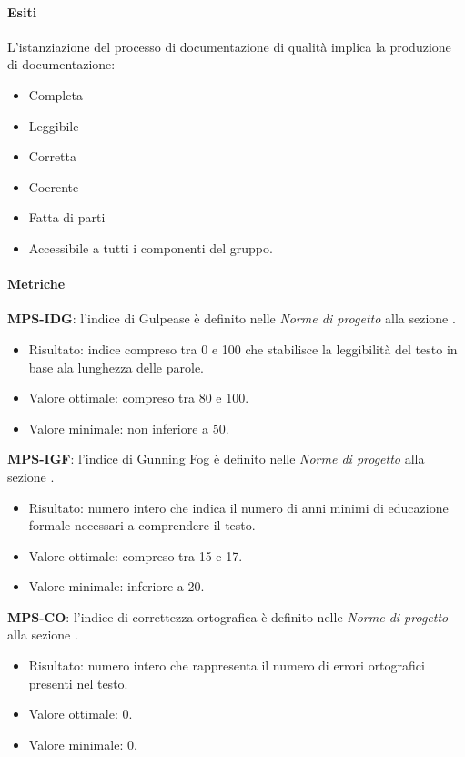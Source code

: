 \documentclass[../piano-di-qualifica.tex]{subfiles}
\begin{document}
\paragraph{Esiti}%
\label{par:esiti}
L'istanziazione del processo di documentazione di qualità implica la produzione di documentazione:
\begin{itemize}
  \item Completa
  \item Leggibile
  \item Corretta
  \item Coerente
  \item Fatta di parti
  \item Accessibile a tutti i componenti del gruppo.
\end{itemize}

\paragraph{Metriche}%
\label{par:metriche}

\textbf{MPS-IDG}: l'indice di Gulpease è definito nelle \textit{Norme di progetto} alla sezione 	.
\begin{itemize}
  \item Risultato: indice compreso tra 0 e 100 che stabilisce la leggibilità del testo in base ala lunghezza delle parole.
  \item Valore ottimale: compreso tra 80 e 100.
  \item Valore minimale: non inferiore a 50.
\end{itemize}

\textbf{MPS-IGF}: l'indice di Gunning Fog è definito nelle \textit{Norme di progetto} alla sezione .
\begin{itemize}
  \item Risultato: numero intero che indica il numero di anni minimi di educazione formale necessari a comprendere il testo.
  \item Valore ottimale: compreso tra 15 e 17.
  \item Valore minimale: inferiore a 20.
\end{itemize}

\textbf{MPS-CO}: l'indice di correttezza ortografica è definito nelle \textit{Norme di progetto} alla sezione .
\begin{itemize}
  \item Risultato: numero intero che rappresenta il numero di errori ortografici presenti nel testo.
  \item Valore ottimale: 0.
  \item Valore minimale: 0.
\end{itemize}
\end{document}

